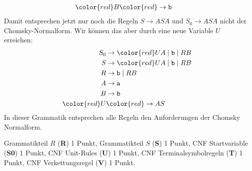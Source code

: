 \begin{loesung}
\begin{enumerate}
\begin{align*}
\color{red}B  &\color{red}\rightarrow \texttt{b}
\end{align*}
Damit entsprechen jetzt nur noch die Regeln $S\rightarrow ASA$ und
$S_0\rightarrow ASA$ nicht der Chomsky-Normalform.
Wir können das aber durch eine neue Variable $U$ erreichen:
\begin{align*}
S_0&\rightarrow {\color{red}U}A \;|\; \texttt{b} \;|\; RB \\
S  &\rightarrow {\color{red}U}A \;|\; \texttt{b} \;|\; RB \\
R  &\rightarrow \texttt{b} \;|\; RB \\
A  &\rightarrow \texttt{a} \\
B  &\rightarrow \texttt{b} \\
\color{red}U  &\color{red}\rightarrow AS
\end{align*}
In dieser Grammatik entsprechen alle Regeln den Anforderungen der
Chomsky Normalform.
\qedhere
\end{enumerate}
\end{loesung}

\begin{bewertung}
Grammatikteil $R$ ({\bf R}) 1 Punkt,
Grammatikteil $S$ ({\bf S}) 1 Punkt,
CNF Startvariable ({\bf S0}) 1 Punkt,
CNF Unit-Rules ({\bf U}) 1 Punkt,
CNF Terminalsymbolregeln ({\bf T}) 1 Punkt,
CNF Verkettungsregel ({\bf V}) 1 Punkt.
\end{bewertung}

